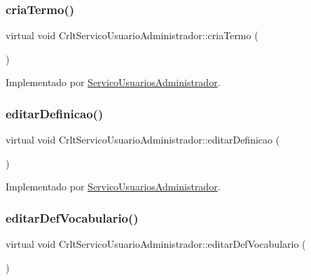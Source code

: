 \subsubsection{\texorpdfstring{cria\+Termo()}{criaTermo()}}
{\footnotesize\ttfamily virtual void Crlt\+Servico\+Usuario\+Administrador\+::cria\+Termo (\begin{DoxyParamCaption}{ }\end{DoxyParamCaption})\hspace{0.3cm}{\ttfamily [pure virtual]}}



Implementado por \mbox{\hyperlink{class_servico_usuarios_administrador_a9002054e8a06338e2a380517b6aeb1f7}{Servico\+Usuarios\+Administrador}}.

\mbox{\label{class_crlt_servico_usuario_administrador_a7b709ffa7b27a96970c71997d75b1032}} 
\subsubsection{\texorpdfstring{editar\+Definicao()}{editarDefinicao()}}
{\footnotesize\ttfamily virtual void Crlt\+Servico\+Usuario\+Administrador\+::editar\+Definicao (\begin{DoxyParamCaption}{ }\end{DoxyParamCaption})\hspace{0.3cm}{\ttfamily [pure virtual]}}



Implementado por \mbox{\hyperlink{class_servico_usuarios_administrador_aa1bda96596ffda5676af7181eaae9466}{Servico\+Usuarios\+Administrador}}.

\mbox{\label{class_crlt_servico_usuario_administrador_aa4ace57c1fe84fc38302133426a2cfd8}} 
\subsubsection{\texorpdfstring{editar\+Def\+Vocabulario()}{editarDefVocabulario()}}
{\footnotesize\ttfamily virtual void Crlt\+Servico\+Usuario\+Administrador\+::editar\+Def\+Vocabulario (\begin{DoxyParamCaption}{ }\end{DoxyParamCaption})\hspace{0.3cm}{\ttfamily [pure virtual]}}



